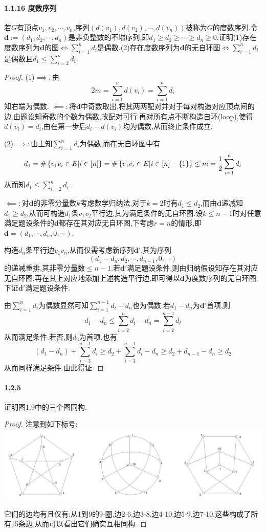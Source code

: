 \documentclass[11pt]{article}
\begin{document}
\paragraph{1.1.16 度数序列}若$G$有顶点$v_1,v_2,\cdots,v_n$,序列$(d(v_1), d(v_2), \cdots , d(v_n))$被称为$G$的度数序列.令$\mathbf{d} := (d_1, d_2, \cdots , d_n)$是非负整数的不增序列,即$d_1 \geq d_2 \geq \cdots \geq d_n \geq 0$.证明(1)存在度数序列为$\mathbf{d}$的图$\iff \sum_{i=1}^n d_i$是偶数.(2)存在度数序列为$\mathbf{d}$的无自环图$\iff \sum_{i=1}^n d_i$是偶数且$d_1\leq \sum_{i=2}^n d_i$.

\begin{proof}
(1)$\implies:$由
$$2m=\sum_{i=1}^n d(v_i)=\sum_{i=1}^{n}d_i$$
知右端为偶数. $\impliedby:$将$\mathbf{d}$中奇数取出,将其两两配对并对于每对构造对应顶点间的边,由题设知奇数的个数为偶数,故配对可行.再对所有点不断构造自环(loop),使得$d(v_i)=d_i$,由在第一步后$d_i-d(v_i)$均为偶数,从而终止条件成立.

(2)$\implies:$由上知$\sum_{i=1}^{n}d_i$为偶数,而在无自环图中有
$$d_1=\#\left\{v_1v_i\in E|i\in [n]\right\}=\#\left\{v_1v_i\in E|i\in [n]-\left\{1\right\}\right\}\leq m=\frac{1}{2}\sum_{i=1}^n d_i$$
从而知$d_1\leq \sum_{i=2}^{n}d_i$.

$\impliedby:$对$\mathbf{d}$的非零分量数$k$考虑数学归纳法.对于$k=2$时有$d_1\leq d_2$,而由$\mathbf{d}$递减知$d_1\geq d_2$,从而可构造$d_1$条$v_1v_2$平行边,其为满足条件的无自环图.设$k\leq n-1$时对任意满足题设条件的$\mathbf{d}$都存在其对应无自环图,下考虑$r=n$的情形,即$\mathbf{d}=(d_1,\cdots,d_n,0,\cdots)$.

构造$d_n$条平行边$v_1v_n$,从而仅需考虑新序列$\mathbf{d}'$,其为序列
$$(d_1-d_n,d_2,\cdots,d_{n-1},0,\cdots)$$
的递减重排,其非零分量数$\leq n-1$.若$\mathbf{d}'$满足题设条件,则由归纳假设知存在其对应无自环图,再在其上对应地添加上述构造平行边,即可得以$\mathbf{d}$为度数序列的无自环图.下证$\mathbf{d}'$满足题设条件.

由$\sum_{i=1}^{n}d_i$为偶数显然可知$\sum_{i=1}^{n-1}d_i -d_n$也为偶数.若$d_1-d_n$为$\mathbf{d}'$首项,则
$$d_1-d_n\leq \sum_{i=2}^n d_i-d_n=\sum_{i=2}^{n-1}d_i$$
从而满足条件.若否,则$d_2$为首项,也有
$$(d_1-d_n)+\sum_{i=3}^{n-1}d_i\geq d_2+\sum_{i=3}^{n-1}d_i -d_n\geq d_2+d_{n-1}-d_n\geq d_2$$
从而同样满足条件.由此得证.
\end{proof}

\paragraph{1.2.5}证明图1.9中的三个图同构.

\begin{proof}
    注意到如下标号:\\
\includegraphics[scale=0.27]{PetersonGraphIsom.png}

它们的边均有且仅有:从1到9的9-圈,边2-6,边3-8,边4-10,边5-9,边7-10.这些构成了所有15条边,从而可以看出它们确实互相同构.
\end{proof}
\end{document}

